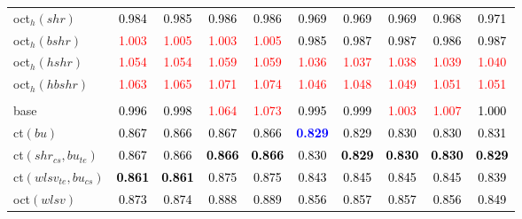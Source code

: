 \begin{tabular}[t]{>{\centering\arraybackslash}m{2.5cm}ccccccccc}
oct$_h(shr)$ & \textcolor{black}{0.984} & \textcolor{black}{0.985} & \textcolor{black}{0.986} & \textcolor{black}{0.986} & \textcolor{black}{0.969} & \textcolor{black}{0.969} & \textcolor{black}{0.969} & \textcolor{black}{0.968} & \textcolor{black}{0.971}\\
oct$_h(bshr)$ & \textcolor{red}{1.003} & \textcolor{red}{1.005} & \textcolor{red}{1.003} & \textcolor{red}{1.005} & \textcolor{black}{0.985} & \textcolor{black}{0.987} & \textcolor{black}{0.987} & \textcolor{black}{0.986} & \textcolor{black}{0.987}\\
oct$_h(hshr)$ & \textcolor{red}{1.054} & \textcolor{red}{1.054} & \textcolor{red}{1.059} & \textcolor{red}{1.059} & \textcolor{red}{1.036} & \textcolor{red}{1.037} & \textcolor{red}{1.038} & \textcolor{red}{1.039} & \textcolor{red}{1.040}\\
oct$_h(hbshr)$ & \textcolor{red}{1.063} & \textcolor{red}{1.065} & \textcolor{red}{1.071} & \textcolor{red}{1.074} & \textcolor{red}{1.046} & \textcolor{red}{1.048} & \textcolor{red}{1.049} & \textcolor{red}{1.051} & \textcolor{red}{1.051}\\
\addlinespace[0.3em]
\multicolumn{10}{c}{\textbf{$k = 2$}}\\
base & \textcolor{black}{0.996} & \textcolor{black}{0.998} & \textcolor{red}{1.064} & \textcolor{red}{1.073} & \textcolor{black}{0.995} & \textcolor{black}{0.999} & \textcolor{red}{1.003} & \textcolor{red}{1.007} & \textcolor{black}{1.000}\\
ct$(bu)$ & \textcolor{black}{0.867} & \textcolor{black}{0.866} & \textcolor{black}{0.867} & \textcolor{black}{0.866} & \textcolor{blue}{\textbf{0.829}} & \textcolor{black}{0.829} & \textcolor{black}{0.830} & \textcolor{black}{0.830} & \textcolor{black}{0.831}\\
ct$(shr_{cs}, bu_{te})$ & \textcolor{black}{0.867} & \textcolor{black}{0.866} & \textcolor{black}{\textbf{0.866}} & \textcolor{black}{\textbf{0.866}} & \textcolor{black}{0.830} & \textcolor{black}{\textbf{0.829}} & \textcolor{black}{\textbf{0.830}} & \textcolor{black}{\textbf{0.830}} & \textcolor{black}{\textbf{0.829}}\\
ct$(wlsv_{te}, bu_{cs})$ & \textcolor{black}{\textbf{0.861}} & \textcolor{black}{\textbf{0.861}} & \textcolor{black}{0.875} & \textcolor{black}{0.875} & \textcolor{black}{0.843} & \textcolor{black}{0.845} & \textcolor{black}{0.845} & \textcolor{black}{0.845} & \textcolor{black}{0.839}\\
oct$(wlsv)$ & \textcolor{black}{0.873} & \textcolor{black}{0.874} & \textcolor{black}{0.888} & \textcolor{black}{0.889} & \textcolor{black}{0.856} & \textcolor{black}{0.857} & \textcolor{black}{0.857} & \textcolor{black}{0.856} & \textcolor{black}{0.849}\\

\end{tabular}
